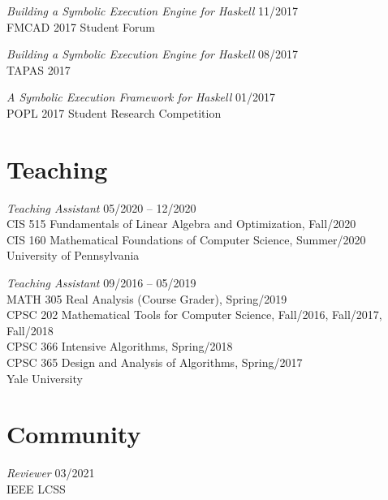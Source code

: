 \documentclass[margin]{res}
\begin{document}
\begin{resume}
\textit{Building a Symbolic Execution Engine for Haskell} \hfill 11/2017 \\
  FMCAD 2017 Student Forum

\textit{Building a Symbolic Execution Engine for Haskell} \hfill 08/2017 \\
  TAPAS 2017

\textit{A Symbolic Execution Framework for Haskell} \hfill 01/2017 \\
  POPL 2017 Student Research Competition


\section{Teaching}
\textit{Teaching Assistant}
  \hfill 05/2020 -- 12/2020 \\
    {CIS 515 Fundamentals of Linear Algebra and Optimization},
      Fall/2020 \\
    {CIS 160 Mathematical Foundations of Computer Science},
      Summer/2020 \\
University of Pennsylvania

\textit{Teaching Assistant}
  \hfill 09/2016 -- 05/2019 \\
    {MATH 305 Real Analysis (Course Grader)},
      Spring/2019 \\
    {CPSC 202 Mathematical Tools for Computer Science},
      Fall/2016, Fall/2017, Fall/2018 \\
    {CPSC 366 Intensive Algorithms},
      Spring/2018 \\
    {CPSC 365 Design and Analysis of Algorithms},
      Spring/2017 \\
Yale University

\section{Community}
\textit{Reviewer} \hfill 03/2021 \\
IEEE LCSS


\end{resume}
\end{document}
